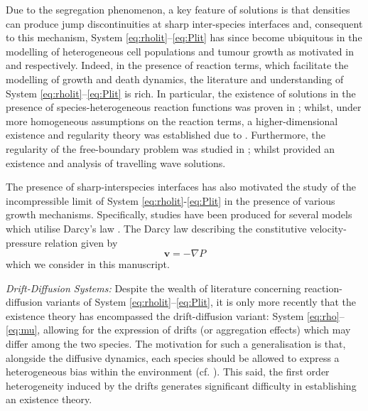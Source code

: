 \documentclass[a4paper,twosided, 11pt]{article}
\theoremstyle{plain}
\theoremstyle{remark}
\numberwithin{equation}{section}
\begin{document}
\medskip 

Due to the segregation phenomenon, a key feature of solutions is that densities can produce jump discontinuities at sharp inter-species interfaces and, consequent to this mechanism, System \eqref{eq:rholit}--\eqref{eq:Plit} has since become ubiquitous in the modelling of heterogeneous cell populations and tumour growth as motivated in \cite{CarrilloMurakawa19,FuGrietteMagal20} and \cite{chaplain2006mathematical,jungel2026multiphasecrossdiffusionmodelstissue} respectively.
Indeed, in the presence of reaction terms, which facilitate the modelling of growth and death dynamics, the literature and understanding of System \eqref{eq:rholit}--\eqref{eq:Plit} is rich.
In particular, the existence of solutions in the presence of species-heterogeneous reaction functions was proven in \cite{CarrilloFagioli18,DruetJungel20}; whilst, under more homogeneous assumptions on the reaction terms, a higher-dimensional existence and regularity theory was established due to \cite{BertschHilhorst12,GwiazdaPerthame19,PriceXu20,Jacobs23CrossDiff}.
Furthermore, the regularity of the free-boundary problem was studied in \cite{KimTon:21}; whilst \cite{BertschHilhorst15,CarrilloLorenzi} provided an existence and analysis of travelling wave solutions. 


\medskip 

The presence of sharp-interspecies interfaces has also motivated the study of the incompressible limit of System \eqref{eq:rholit}-\eqref{eq:Plit} in the presence of various growth mechanisms.
Specifically, studies have been produced for several models which utilise Darcy's law \cite{ChertockDegondHecht19,DegondHectVauchelet20,BubbaPerthame20,LiuXu21,David23,MR4745662}. 
The Darcy law describing the constitutive velocity-pressure relation given by
\[
\boldsymbol{v} = -\nabla P
\]
which we consider in this manuscript.

\medskip 

\emph{Drift-Diffusion Systems:} Despite the wealth of literature concerning reaction-diffusion variants of System \eqref{eq:rholit}--\eqref{eq:Plit}, it is only more recently that the existence theory has encompassed the drift-diffusion variant: System \eqref{eq:rho}--\eqref{eq:mu}, allowing for the expression of drifts (or aggregation effects) which may differ among the two species. 
The motivation for such a generalisation is that, alongside the diffusive dynamics, each species should be allowed to express a heterogeneous bias within the environment (cf. \cite{BurgerDifrancesco18,CarrilloHuang18}).
This said, the first order heterogeneity induced by the drifts generates significant difficulty in establishing an existence theory.
\end{document}
